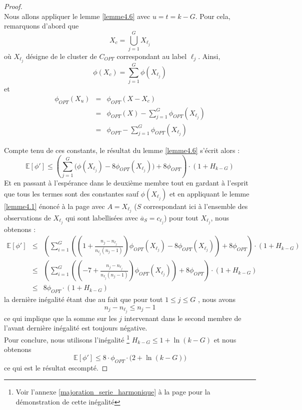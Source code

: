 \documentclass[12pt,a4paper]{book}
\newcommand{\E}{\mathbb{E}}
\newcommand{\1}{\mathds{1}}
\begin{document}
	\begin{proof}
		~\\
		Nous allons appliquer le lemme \ref{lemme4.6} avec $u=t=k-G$. Pour cela, remarquons d'abord que 
		$$
			X_c = \bigcup_{j=1}^G X_{\ell_j}
		$$
		où $X_{\ell_j}$ désigne de le cluster de $C_{OPT}$ correspondant au label $\ell_j$. Ainsi,
		$$
			\phi(X_c) = \sum_{j=1}^G \phi\left(X_{\ell_j}\right)
		$$
		et 
		\begin{eqnarray*}
			\phi_{OPT}(X_u) &=& \phi_{OPT} (X-X_c) \\
			&=& \phi_{OPT}(X) - \sum_{j=1}^G \phi_{OPT} \left( X_{\ell_j} \right) \\
			&=& \phi_{OPT} - \sum_{j=1}^G \phi_{OPT} \left( X_{\ell_j} \right)
		\end{eqnarray*}
		
		Compte tenu de ces constants, le résultat du lemme \ref{lemme4.6} s'écrit alors :
		$$
			\E[\phi'] \leq \left( \sum_{j=1}^G \bigg( \phi(X_{\ell_j}) - 8 \phi_{OPT}(X_{\ell_j}) \bigg) + 8 \phi_{OPT} \right) \cdot \left(1 + H_{k-G} \right)
		$$
		Et en passant à l'espérance dans le deuxième membre tout en gardant à l'esprit que tous les termes sont des constantes sauf $\phi(X_{\ell_j})$ et en appliquant le lemme \ref{lemme4.1} énoncé à la page \pageref{lemme4.1} avec $A=X_{\ell_j}$ ($S$ correspondant ici à l'ensemble des observations de $X_{\ell_j}$ qui sont labellisées avec $\overline{a}_S=c_{\ell_j}$) pour tout $X_{\ell_j}$, nous obtenons :
		\begin{eqnarray*}
			\E[\phi'] & \leq & \left( \sum_{i=1}^G \left( \left( 1 + \frac{n_j -n_{\ell_j}}{n_{\ell_j}(n_j - 1)} \right) \phi_{OPT}(X_{\ell_j}) - 8 \phi_{OPT}(X_{\ell_j}) \right) + 8 \phi_{OPT} \right) \cdot \left(1 + H_{k-G} \right) \\
			& \leq & \left( \sum_{i=1}^G \left( \left( -7 + \frac{n_j -n_{\ell_j}}{n_{\ell_j}(n_j - 1)} \right) \phi_{OPT}(X_{\ell_j}) \right) + 8 \phi_{OPT} \right) \cdot \left(1 + H_{k-G} \right) \\
			& \leq & 8 \phi_{OPT} \cdot \left(1 + H_{k-G} \right) 
		\end{eqnarray*}
		la dernière inégalité étant due au fait que pour tout $1 \leq j \leq G$ , nous avons 
		$$
			n_j - n_{\ell_j} \leq n_j - 1
		$$ 
		ce qui implique que la somme sur les $j$ intervenant dans le second membre de l'avant dernière inégalité est toujours négative.\\
		Pour conclure, nous utilisons l'inégalité \footnote{Voir l'annexe \ref{majoration_serie_harmonique} à la page \pageref{majoration_serie_harmonique} pour la démonstration de cette inégalité} $H_{k-G} \leq 1 + \ln (k-G)$ et nous obtenons 
		$$
			\E [\phi'] \leq 8 \cdot \phi_{OPT} \cdot \bigg(2 + \ln (k-G)\bigg)
		$$
		ce qui est le résultat escompté.
	\end{proof}
	
\end{document}
